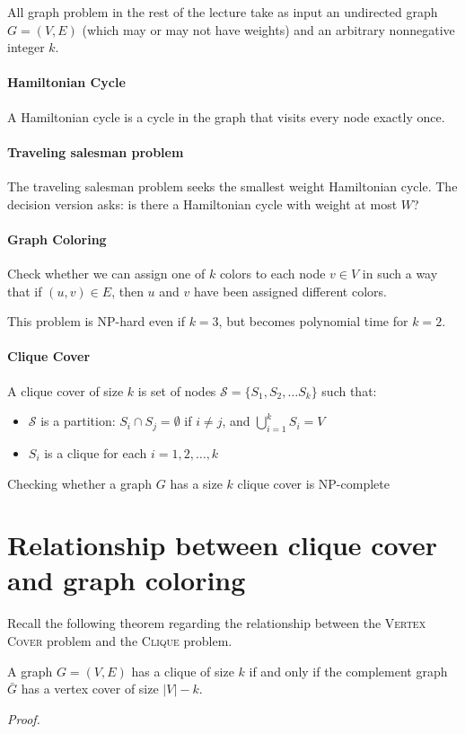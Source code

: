 \documentclass[11  pt]{article}
\begin{document}
\newpage
All graph problem in the rest of the lecture take as input an undirected graph $G = (V,E)$ (which may or may not have weights) and an arbitrary nonnegative integer $k$.

\paragraph{Hamiltonian Cycle}
A Hamiltonian cycle is a cycle in the graph that visits every node exactly once.


\vfill

\paragraph{Traveling salesman problem}
The traveling salesman problem seeks the smallest weight Hamiltonian cycle. The decision version asks: is there a Hamiltonian cycle with weight at most $W$?


\vfill


\newpage
\paragraph{Graph Coloring}
Check whether we can assign one of $k$ colors to each node $v \in V$ in such a way that if $(u,v) \in E$, then $u$ and $v$ have been assigned different colors. 

\vfill

This problem is NP-hard even if $k = 3$, but becomes polynomial time for $k = 2$. 

\paragraph{Clique Cover}
A clique cover of size $k$ is set of nodes $\mathcal{S} = \{S_1, S_2, \hdots S_k\}$ such that:
\begin{itemize}
	\item $\mathcal{S}$ is a partition: $S_i \cap S_j = \emptyset $ if $i \neq j$, and $\bigcup_{i = 1}^k S_i = V$
	\item $S_i$ is a clique for each $i = 1, 2, \hdots , k$
\end{itemize}
Checking whether a graph $G$ has a size $k$ clique cover is NP-complete
\vfill

\newpage
\section{Relationship between clique cover and graph coloring}
Recall the following theorem regarding the relationship between the \textsc{Vertex Cover} problem and the \textsc{Clique} problem.
\begin{theorem}
	A graph $G = (V,E)$ has a clique of size $k$ if and only if the complement graph $\bar{G}$ has a vertex cover of size $|V| -k$.
\end{theorem}
\textit{Proof.} 
\end{document}
